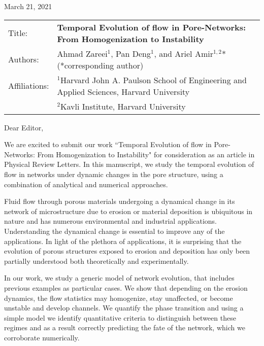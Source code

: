 \documentclass[11pt]{harvardletter}
\date{} %
\begin{document}
\begin{letter}{}

\hfill{March 21, 2021}
\vspace{20mm}


    \begin{tabular}{l l }
        \small{Title:}  & \textbf{\small{Temporal Evolution of flow in Pore-Networks: From Homogenization to Instability}} \vspace{2mm} \\ 
        \small{Authors:}  & \small{Ahmad Zareei$^1$, Pan Deng$^1$, and Ariel Amir$^{1,2}$* (*corresponding author)} \vspace{2mm} \\
        \small{Affiliations:} & \small{$^1$Harvard John A. Paulson School of Engineering and Applied Sciences, Harvard University} \\
        & \small{$^2$Kavli Institute, Harvard University}
    \end{tabular}

\vspace{5mm}


\opening{Dear Editor,}


We are excited to submit our work “Temporal Evolution of flow in Pore-Networks: From Homogenization to Instability" for consideration as an article in Physical Review Letters.
In this manuscript, we study the temporal evolution of flow in networks under dynamic changes in the pore structure, using a combination of analytical and numerical approaches.

Fluid flow through porous materials undergoing a dynamical change in its network of microstructure due to erosion or material deposition is ubiquitous in nature and has numerous environmental and industrial applications. Understanding the dynamical change is essential to improve any of the applications. In light of the plethora of applications, it is surprising that the evolution of porous structures exposed to erosion and deposition has only been partially understood both theoretically and experimentally.

In our work, we study a generic model of network evolution, that includes previous examples as particular cases. We show that depending on the erosion dynamics, the flow statistics may homogenize, stay unaffected, or become unstable and develop channels. We quantify the phase transition and using a simple model we identify quantitative criteria to distinguish between these regimes and as a result correctly predicting the fate of
the network, which we corroborate numerically. 


\end{letter}
\end{document}
